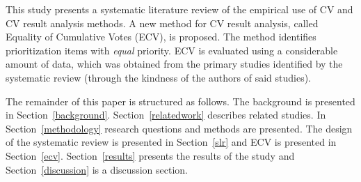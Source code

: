 This study presents a systematic literature review of the empirical use of CV and CV result analysis methods.
A new method for CV result analysis, called Equality of Cumulative Votes (ECV), is proposed.
The method identifies prioritization items with \emph{equal} priority.
ECV is evaluated using a considerable amount of data, which was obtained from the primary studies identified by the systematic review (through the kindness of the authors of said studies).

The remainder of this paper is structured as follows. 
The background is presented in Section~\ref{background}.
Section~\ref{relatedwork} describes related studies.
In Section~\ref{methodology} research questions	and methods are presented.
The design of the systematic review is presented in Section~\ref{slr} and ECV is presented in Section~\ref{ecv}.
Section~\ref{results} presents the results of the study and Section~\ref{discussion} is a discussion section.